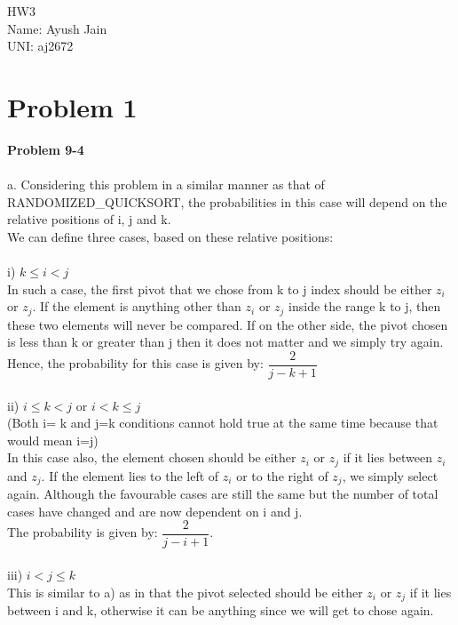 \documentclass[10pt]{article}
\begin{document}
\vspace*{\fill}
\begin{Huge}
\begin{center}
HW3\\
Name: Ayush Jain\\
UNI: aj2672
\end{center}
\end{Huge}
\vspace*{\fill}
\newpage
\section{Problem 1}
\textbf{Problem 9-4}\\\\
a. Considering this problem in a similar manner as that of RANDOMIZED\_QUICKSORT, the probabilities in this case will depend on the relative positions of i, j and k.\\
We can define three cases, based on these relative positions:\\\\
i) $k \leq i < j$\\
In such a case, the first pivot that we chose from k to j index should be either $z_{i}$ or $z_{j}$. If the element is anything other than $z_{i}$ or $z_{j}$ inside the range k to j, then these two elements will never be compared. If on the other side, the pivot chosen is less than k or greater than j then it does not matter and we simply try again.\\
Hence, the probability for this case is given by: $\dfrac{2}{j-k+1}$\\\\
ii) $i \leq k < j$ or $i < k \leq j$ \\
(Both i= k  and j=k conditions cannot hold true at the same time because that would mean i=j)\\
In this case also, the element chosen should be either $z_{i}$ or $z_{j}$ if it  lies between $z_{i}$ and $z_{j}$. If the element lies to the left of $z_{i}$ or to the right of $z_{j}$, we simply select again. Although the favourable cases are still the same but the number of total cases have changed and are now dependent on i and j.\\
The probability is given by: $\dfrac{2}{j-i+1}$.\\\\
iii) $i < j \leq k$\\
This is similar to a) as in that the pivot selected should be either $z_{i}$ or $z_{j}$ if it lies between i and k, otherwise it can be anything since we will get to chose again.\\
\end{document}
